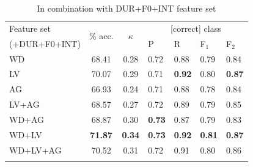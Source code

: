 \documentclass[a4paper]{article}
\begin{document}
\begin{table}[!b]
			\begin{subtable}{\columnwidth}
			\centering
			\caption{In combination with DUR+F0+INT feature set}
			\begin{tabularx}{\columnwidth}{lccXXXX}			
			\toprule
			Feature set & \multirow{2}{*}{\% acc.} & \multirow{2}{*}{$\kappa$} & \multicolumn{4}{c}{[correct] class} \\
			 \cmidrule(lr){4-7}
			(+DUR+F0+INT)& & & P & R & F$_1$ & F$_2$ \\
			\midrule
WD	&	68.41	&	0.28	&	0.72	&	0.88	&	0.79	&	0.84	\\
LV	&	70.07	&	0.29	&	0.71	&	\textbf{0.92}	&	0.80	&	\textbf{0.87}	\\
AG	&	66.93	&	0.24	&	0.71	&	0.88	&	0.78	&	0.84	\\
LV+AG	&	68.57	&	0.27	&	0.72	&	0.89	&	0.79	&	0.85	\\
WD+AG	&	68.87	&	0.30	&	\textbf{0.73}	&	0.87	&	0.79	&	0.83	\\
WD+LV	&	\textbf{71.87}	&	\textbf{0.34}	&	\textbf{0.73}	&	\textbf{0.92}	&	\textbf{0.81}	&	\textbf{0.87}	\\		
WD+LV+AG	&	70.52	&	0.31	&	0.72	&	0.91	&	0.80	&	0.86	\\
			\bottomrule
			\label{tab:results:spkrword:all}
			\end{tabularx}
		\end{subtable}
		
		\label{tab:results:spkrword}
	\end{table}
	
\end{document}
